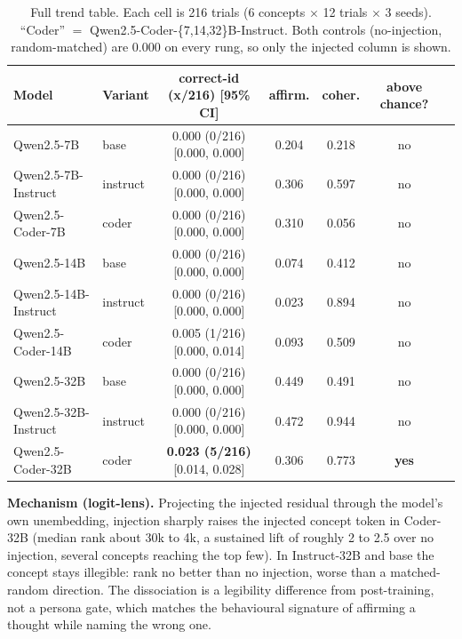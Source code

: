 \documentclass[11pt]{article}
\begin{document}
\begin{table}[htbp]
\centering
\small
\begin{tabular}{llccccc}
\toprule
Model & Variant & correct-id (x/216) [95\% CI] & affirm. & coher. & above chance? \\
\midrule
Qwen2.5-7B            & base     & 0.000 (0/216) [0.000, 0.000]          & 0.204 & 0.218 & no      \\
Qwen2.5-7B-Instruct   & instruct & 0.000 (0/216) [0.000, 0.000]          & 0.306 & 0.597 & no      \\
Qwen2.5-Coder-7B      & coder    & 0.000 (0/216) [0.000, 0.000]          & 0.310 & 0.056 & no      \\
Qwen2.5-14B           & base     & 0.000 (0/216) [0.000, 0.000]          & 0.074 & 0.412 & no      \\
Qwen2.5-14B-Instruct  & instruct & 0.000 (0/216) [0.000, 0.000]          & 0.023 & 0.894 & no      \\
Qwen2.5-Coder-14B     & coder    & 0.005 (1/216) [0.000, 0.014]          & 0.093 & 0.509 & no      \\
Qwen2.5-32B           & base     & 0.000 (0/216) [0.000, 0.000]          & 0.449 & 0.491 & no      \\
Qwen2.5-32B-Instruct  & instruct & 0.000 (0/216) [0.000, 0.000]          & 0.472 & 0.944 & no      \\
Qwen2.5-Coder-32B     & coder    & \textbf{0.023 (5/216)} [0.014, 0.028] & 0.306 & 0.773 & \textbf{yes} \\
\bottomrule
\end{tabular}
\caption{Full trend table. Each cell is 216 trials (6 concepts $\times$ 12 trials $\times$ 3 seeds). ``Coder'' $=$ Qwen2.5-Coder-\{7,14,32\}B-Instruct. Both controls (no-injection, random-matched) are 0.000 on every rung, so only the injected column is shown.}
\label{tab:full}
\end{table}

\textbf{Mechanism (logit-lens).} Projecting the injected residual through the model's own unembedding, injection sharply raises the injected concept token in Coder-32B (median rank about 30k to 4k, a sustained lift of roughly 2 to 2.5 over no injection, several concepts reaching the top few). In Instruct-32B and base the concept stays illegible: rank no better than no injection, worse than a matched-random direction. The dissociation is a legibility difference from post-training, not a persona gate, which matches the behavioural signature of affirming a thought while naming the wrong one.
\end{document}
